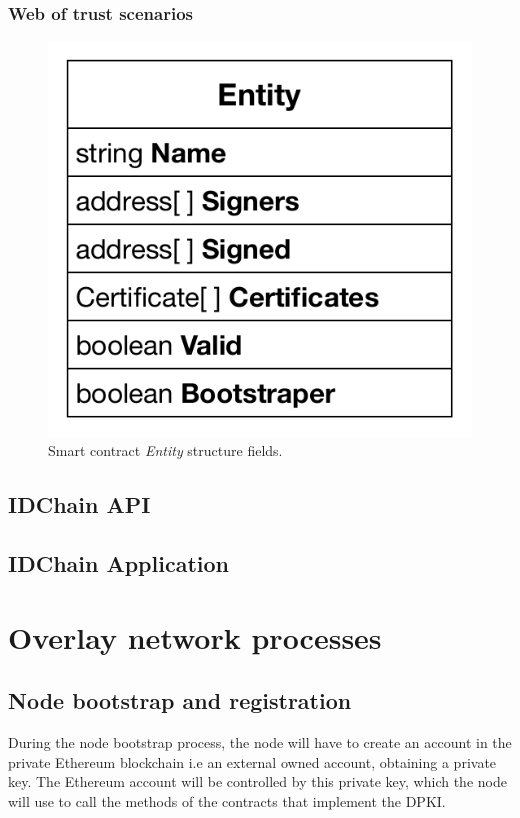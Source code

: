 \subsubsection{Web of trust scenarios}

\begin{figure}
  \includegraphics[width=\linewidth]{Figures/entity-structure.pdf}
  \caption{Smart contract \textit{Entity} structure fields.}
  \label{fig:entity-structure}
\end{figure}

\subsection{IDChain API}

\subsection{IDChain Application}

\section{Overlay network processes}

\subsection{Node bootstrap and registration}
During the node bootstrap process, the node will have to create an account in the private Ethereum blockchain i.e an external owned account, obtaining a private key.
The Ethereum account will be controlled by this private key, which the node will use to call the methods of the contracts that implement the DPKI.

